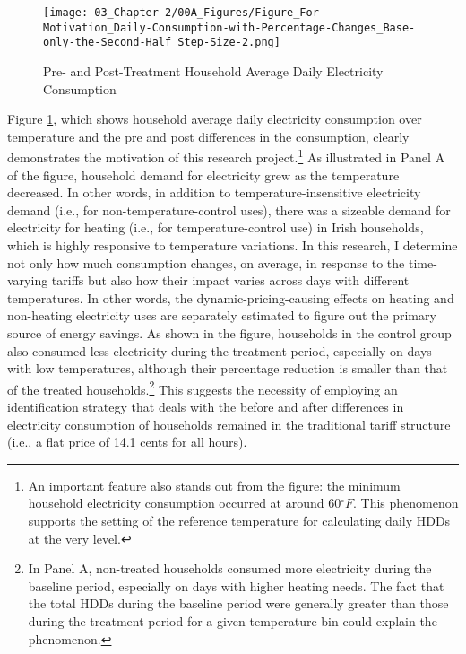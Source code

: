 \begin{figure}[!htbp]
\centering
\texttt{[image: 03\_Chapter-2/00A\_Figures/Figure\_For-Motivation\_Daily-Consumption-with-Percentage-Changes\_Base-only-the-Second-Half\_Step-Size-2.png]}
\caption{Pre- and Post-Treatment Household Average Daily Electricity Consumption}
\label{Figure:Pre-and-Post-Treatment-Household-Average-Daily-Electricity-Consumption}
\end{figure}

Figure \ref{Figure:Pre-and-Post-Treatment-Household-Average-Daily-Electricity-Consumption}, which shows household average daily electricity consumption over temperature and the pre and post differences in the consumption, clearly demonstrates the motivation of this research project.\footnote{An important feature also stands out from the figure: the minimum household electricity consumption occurred at around 60$^{\circ}F$. This phenomenon supports the setting of the reference temperature for calculating daily HDDs at the very level.} As illustrated in Panel A of the figure, household demand for electricity grew as the temperature decreased. In other words, in addition to temperature-insensitive electricity demand (i.e., for non-temperature-control uses), there was a sizeable demand for electricity for heating (i.e., for temperature-control use) in Irish households, which is highly responsive to temperature variations. In this research, I determine not only how much consumption changes, on average, in response to the time-varying tariffs but also how their impact varies across days with different temperatures. In other words, the dynamic-pricing-causing effects on heating and non-heating electricity uses are separately estimated to figure out the primary source of energy savings. As shown in the figure, households in the control group also consumed less electricity during the treatment period, especially on days with low temperatures, although their percentage reduction is smaller than that of the treated households.\footnote{In Panel A, non-treated households consumed more electricity during the baseline period, especially on days with higher heating needs. The fact that the total HDDs during the baseline period were generally greater than those during the treatment period for a given temperature bin could explain the phenomenon.} This suggests the necessity of employing an identification strategy that deals with the before and after differences in electricity consumption of households remained in the traditional tariff structure (i.e., a flat price of 14.1 cents for all hours). 

